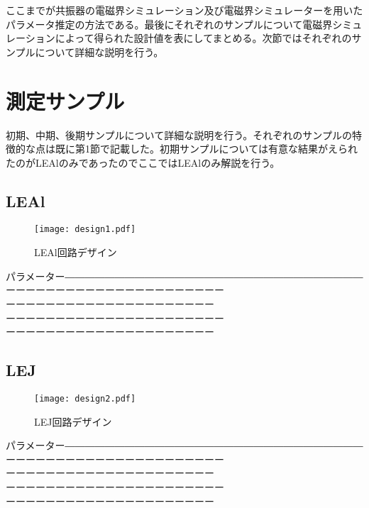         ここまでが共振器の電磁界シミュレーション及び電磁界シミュレーターを用いたパラメータ推定の方法である。最後にそれぞれのサンプルについて電磁界シミュレーションによって得られた設計値を表にしてまとめる。次節ではそれぞれのサンプルについて詳細な説明を行う。
\section{測定サンプル}
    初期、中期、後期サンプルについて詳細な説明を行う。それぞれのサンプルの特徴的な点は既に第1節で記載した。初期サンプルについては有意な結果がえられたのがLEAlのみであったのでここではLEAlのみ解説を行う。
    \subsection{LEAl}
    \begin{figure}[H]
        \centering
        \texttt{[image: design1.pdf]}
        \caption{LEAl回路デザイン}
    \end{figure}
    パラメーター――――――――――――――――――――――――――――――\\
    ーーーーーーーーーーーーーーーーーーーーーー\\
    ーーーーーーーーーーーーーーーーーーーーー\\
    ーーーーーーーーーーーーーーーーーーーーーー\\
    ーーーーーーーーーーーーーーーーーーーーー\\
    \subsection{LEJ}
    \begin{figure}[H]
        \centering
        \texttt{[image: design2.pdf]}
        \caption{LEJ回路デザイン}
    \end{figure}
    パラメーター――――――――――――――――――――――――――――――\\
    ーーーーーーーーーーーーーーーーーーーーーー\\
    ーーーーーーーーーーーーーーーーーーーーー\\
    ーーーーーーーーーーーーーーーーーーーーーー\\
    ーーーーーーーーーーーーーーーーーーーーー\\
